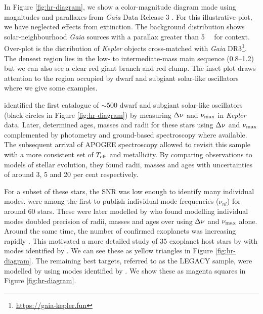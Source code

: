 In Figure \ref{fig:hr-diagram}, we show a color-magnitude diagram made using magnitudes and parallaxes from \emph{Gaia} Data Release 3 \citep[DR3;][]{GaiaCollaboration.Vallenari.ea2022}. For this illustrative plot, we have neglected effects from extinction. The background distribution shows solar-neighbourhood \emph{Gaia} sources with a parallax greater than \SI{5}{\milli\aarcsec} for context. Over-plot is the distribution of \emph{Kepler} objects cross-matched with \emph{Gaia} DR3\footnote{\url{https://gaia-kepler.fun}}. The densest region lies in the low- to intermediate-mass main sequence (\SIrange{0.8}{1.2}{\solarmass}) but we can also see a clear red giant branch and red clump. The inset plot draws attention to the region occupied by dwarf and subgiant solar-like oscillators where we give some examples.

\citet{Chaplin.Kjeldsen.ea2011} identified the first catalogue of \(\sim 500\) dwarf and subgiant solar-like oscillators (black circles in Figure \ref{fig:hr-diagram}) by measuring \({\Delta\nu}\) and \({\nu_\mathrm{max}}\) in \emph{Kepler} data. Later, \citet{Chaplin.Basu.ea2014} determined ages, masses and radii for these stars using \({\Delta\nu}\) and \({\nu_\mathrm{max}}\) complemented by photometry and ground-based spectroscopy where available. The subsequent arrival of APOGEE spectroscopy allowed \citet{Serenelli.Johnson.ea2017} to revisit this sample with a more consistent set of \({T_\mathrm{eff}}\) and metallicity. By comparing observations to models of stellar evolution, they found radii, masses and ages with uncertainties of around 3, 5 and 20 per cent respectively.

For a subset of these stars, the SNR was low enough to identify many individual modes. \citet{Appourchaux.Chaplin.ea2012} were among the first to publish individual mode frequencies (\(\nu_{nl}\)) for around 60 stars. These were later modelled by \citet{Metcalfe.Creevey.ea2014} who found modelling individual modes doubled precision of radii, masses and ages over using \({\Delta\nu}\) and \({\nu_\mathrm{max}}\) alone. Around the same time, the number of confirmed exoplanets was increasing rapidly \needcite. This motivated a more detailed study of 35 exoplanet host stars by \citet{SilvaAguirre.Davies.ea2015} with modes identified by \citet{Davies.Aguirre.ea2016}. We can see these as yellow triangles in Figure \ref{fig:hr-diagram}. The remaining best targets, referred to as the LEGACY sample, were modelled by \citet{SilvaAguirre.Lund.ea2017} using modes identified by \citet{Lund.SilvaAguirre.ea2017}. We show these as magenta squares in Figure \ref{fig:hr-diagram}.

